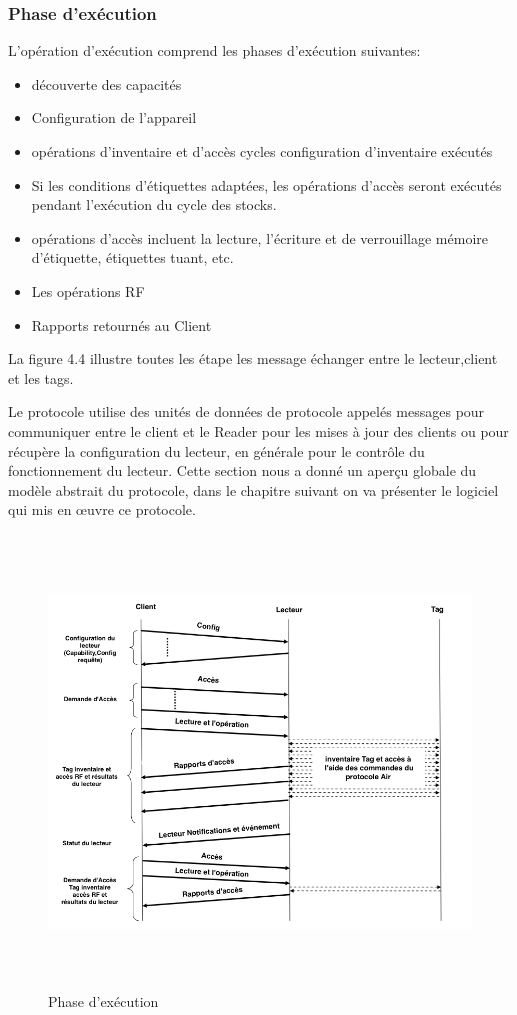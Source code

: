 \documentclass[11pt, a4paper, twoside]{book}
\begin{document}
\subsubsection{Phase d'exécution}
L'opération d'exécution comprend les phases d'exécution suivantes:
\begin{itemize}
\item découverte des capacités
\item Configuration de l'appareil
\item opérations d'inventaire et d'accès cycles configuration d'inventaire exécutés
\item Si les conditions d'étiquettes adaptées, les opérations d'accès seront exécutés pendant l'exécution du cycle des stocks.
\item  opérations d'accès incluent la lecture, l'écriture et de verrouillage mémoire d'étiquette, étiquettes tuant, etc.
\item Les opérations RF
\item Rapports retournés au Client
\end{itemize}

La figure 4.4 illustre toutes les étape les message échanger entre le lecteur,client et les tags.

Le protocole utilise des unités de données de protocole appelés messages pour communiquer entre le client et le Reader pour  les mises à jour des clients ou pour récupère la configuration du lecteur, en générale pour le contrôle du fonctionnement du lecteur. Cette section nous a donné un aperçu globale du modèle abstrait du protocole, dans le chapitre suivant on va présenter le logiciel qui mis en œuvre ce protocole.
\begin{figure}[!h]
\centering
\includegraphics[height=12cm]{runtime}
\caption{Phase d'exécution}
\end{figure}
\pagebreak
\end{document}
